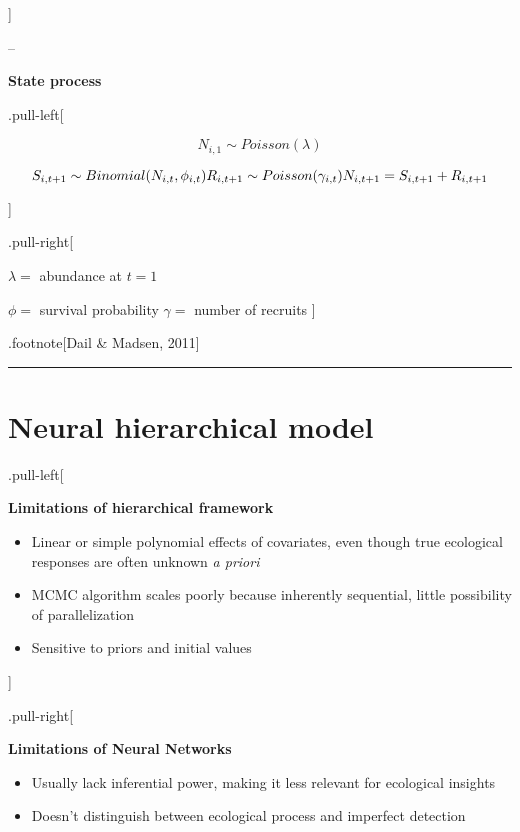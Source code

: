 \documentclass[
]{article}
\begin{document}
{]}

--

\textbf{State process}

.pull-left{[}

\[N_{i,1} \sim Poisson(\lambda)\]

\[S_{i,t+1} \sim Binomial(N_{i,t}, \phi_{i,t})\\
R_{i,t+1} \sim Poisson(\gamma_{i,t})\\
N_{i,t+1} = S_{i,t+1} + R_{i,t+1}\]

{]}

.pull-right{[}

\(\lambda =\) abundance at \(t = 1\)

\(\phi =\) survival probability \(\gamma =\) number of recruits {]}

.footnote{[}Dail \& Madsen, 2011{]}

\begin{center}\rule{0.5\linewidth}{0.5pt}\end{center}

\section{Neural hierarchical model}\label{neural-hierarchical-model}

.pull-left{[}

\textbf{Limitations of hierarchical framework}

\begin{itemize}
\item
  Linear or simple polynomial effects of covariates, even though true
  ecological responses are often unknown \emph{a priori}
\item
  MCMC algorithm scales poorly because inherently sequential, little
  possibility of parallelization
\item
  Sensitive to priors and initial values
\end{itemize}

{]}

.pull-right{[}

\textbf{Limitations of Neural Networks}

\begin{itemize}
\item
  Usually lack inferential power, making it less relevant for ecological
  insights
\item
  Doesn't distinguish between ecological process and imperfect detection
\end{itemize}
\end{document}
